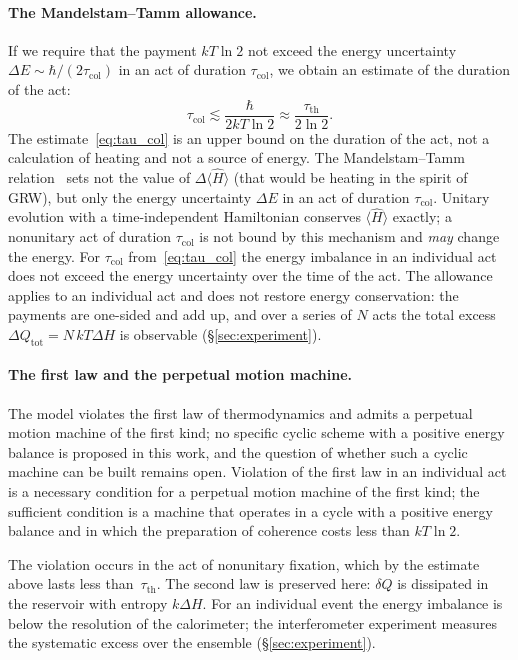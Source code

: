 \documentclass[11pt,a4paper]{article}
\newcommand{\Sref}[1]{\hyperref[#1]{\S\ref{#1}}}
\begin{document}
\paragraph{The Mandelstam--Tamm allowance.}
If we require that the payment $kT\ln 2$ not exceed the energy uncertainty $\Delta E\sim\hbar/(2\tau_{\mathrm{col}})$ in an act of duration $\tau_{\mathrm{col}}$, we obtain an estimate of the duration of the act:
\begin{equation}
\tau_{\mathrm{col}} \lesssim \frac{\hbar}{2kT\ln 2} \approx \frac{\tau_{\mathrm{th}}}{2\ln 2}.
\label{eq:tau_col}
\end{equation}
The estimate~\eqref{eq:tau_col} is an upper bound on the duration of the act, not a calculation of heating and not a source of energy. The Mandelstam--Tamm relation~\cite{mandelstam1945} sets not the value of $\Delta\langle\hat{H}\rangle$ (that would be heating in the spirit of GRW), but only the energy uncertainty $\Delta E$ in an act of duration $\tau_{\mathrm{col}}$. Unitary evolution with a time-independent Hamiltonian conserves $\langle\hat{H}\rangle$ exactly; a nonunitary act of duration $\tau_{\mathrm{col}}$ is not bound by this mechanism and \emph{may} change the energy. For $\tau_{\mathrm{col}}$ from~\eqref{eq:tau_col} the energy imbalance in an individual act does not exceed the energy uncertainty over the time of the act. The allowance applies to an individual act and does not restore energy conservation: the payments are one-sided and add up, and over a series of $N$ acts the total excess $\Delta Q_{\mathrm{tot}} = N\,kT\Delta H$ is observable (\Sref{sec:experiment}).

\paragraph{The first law and the perpetual motion machine.}
The model violates the first law of thermodynamics and admits a perpetual motion machine of the first kind; no specific cyclic scheme with a positive energy balance is proposed in this work, and the question of whether such a cyclic machine can be built remains open. Violation of the first law in an individual act is a necessary condition for a perpetual motion machine of the first kind; the sufficient condition is a machine that operates in a cycle with a positive energy balance and in which the preparation of coherence costs less than $kT\ln 2$.

The violation occurs in the act of nonunitary fixation, which by the estimate above lasts less than~$\tau_{\mathrm{th}}$. The second law is preserved here: $\delta Q$ is dissipated in the reservoir with entropy $k\Delta H$. For an individual event the energy imbalance is below the resolution of the calorimeter; the interferometer experiment measures the systematic excess over the ensemble (\Sref{sec:experiment}).
\end{document}
